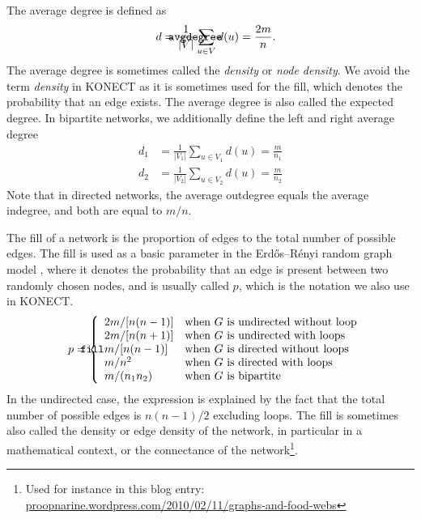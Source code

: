 \documentclass{article}
\def\mathnote#1{%
  \tag*{\rlap{\hspace\marginparsep\smash{\parbox[t]{\marginparwidth}{#1}}}}
}
\begin{document}
The average degree is defined as
\begin{align}
  \mathnote{\texttt{avgdegree}}
  d &= \frac 1 {|V|} \sum_{u\in V} d(u) = \frac {2m} n . 
\end{align}
The average degree is sometimes called the \emph{density} or \emph{node density}.  We avoid the term
\emph{density} in KONECT as it is sometimes used for the fill, which
denotes the probability that an edge exists.  The average degree is also
called the expected degree.  
In bipartite networks, we
additionally define the left and right average degree
\begin{align}
  d_1 &= \frac 1 {|V_1|} \sum_{u \in V_1} d(u) = \frac m {n_1} \\
  d_2 &= \frac 1 {|V_2|} \sum_{u \in V_2} d(u) = \frac m {n_2} 
\end{align}
Note that in directed networks, the average outdegree equals the average
indegree, and both are equal to $m/n$. 

The fill of a network is the proportion of edges to the total
number of possible edges. 
The fill is used as a basic parameter in the Erdős--Rényi random graph
model \citep{b569}, where it denotes the probability that an edge is present between
two randomly chosen nodes, and is usually called $p$, which is the
notation we also use in KONECT. 
\begin{align}
  \mathnote{\texttt{fill}}
  p &= \left\{ \begin{array}{ll}
    2m / [n(n-1)] & \text{when $G$ is undirected without loop} \\
    2m / [n(n+1)] & \text{when $G$ is undirected with loops} \\
    m / [n(n-1)] & \text{when $G$ is directed without loops} \\
    m / n^2 & \text{when $G$ is directed with loops} \\
    m / (n_1 n_2) & \text{when $G$ is bipartite} 
  \end{array}\right. 
\end{align}
In the undirected case, the expression is explained by the fact that the
total number of possible edges is $n(n-1)/2$ excluding loops.  
The fill is sometimes also called the density or edge density of the network, in
particular in a mathematical context, or the connectance of the
network\footnote{Used for instance in this blog entry:  \href{https://proopnarine.wordpress.com/2010/02/11/graphs-and-food-webs/}{proopnarine.wordpress.com/2010/02/11/graphs-and-food-webs}}. 
\end{document}
